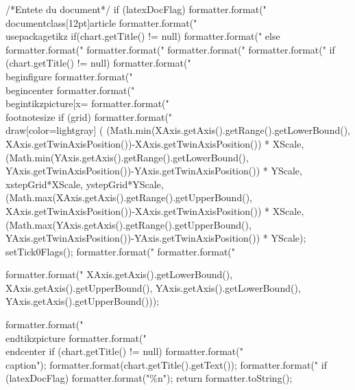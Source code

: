 \begin{code}
\begin{hide}
{      /*Entete du document*/
      if (latexDocFlag) {
         formatter.format("\\documentclass[12pt]{article}%
         formatter.format("\\usepackage{tikz}%
      }
      if(chart.getTitle() != null)
         formatter.format("%
      else
         formatter.format("%
      formatter.format("%
      formatter.format("%
      formatter.format("%
      if (chart.getTitle() != null)
         formatter.format("\\begin{figure}%
      formatter.format("\\begin{center}%
      formatter.format("\\begin{tikzpicture}[x=%
      formatter.format("\\footnotesize%
      if (grid)
         formatter.format("\\draw[color=lightgray] (%
            (Math.min(XAxis.getAxis().getRange().getLowerBound(), XAxis.getTwinAxisPosition())-XAxis.getTwinAxisPosition()) * XScale,
            (Math.min(YAxis.getAxis().getRange().getLowerBound(), YAxis.getTwinAxisPosition())-YAxis.getTwinAxisPosition()) * YScale,
            xstepGrid*XScale, ystepGrid*YScale,
            (Math.max(XAxis.getAxis().getRange().getUpperBound(), XAxis.getTwinAxisPosition())-XAxis.getTwinAxisPosition()) * XScale,
            (Math.max(YAxis.getAxis().getRange().getUpperBound(), YAxis.getTwinAxisPosition())-YAxis.getTwinAxisPosition()) * YScale);
      setTick0Flags();
      formatter.format("%
      formatter.format("%

      formatter.format("%
                                                            XAxis.getAxis().getLowerBound(), XAxis.getAxis().getUpperBound(),
                                                            YAxis.getAxis().getLowerBound(), YAxis.getAxis().getUpperBound()));

      formatter.format("\\end{tikzpicture}%
      formatter.format("\\end{center}%
      if (chart.getTitle() != null) {
         formatter.format("\\caption{");
         formatter.format(chart.getTitle().getText());
         formatter.format("}%
      }
      if (latexDocFlag)
         formatter.format("\%n");
      return formatter.toString();
   }\end{hide}
\end{code}

\begin{code}
\begin{hide}
}\end{hide}
\end{code}

